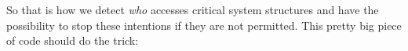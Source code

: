 \documentclass[12pt]{article}
\begin{document}
So that is how we detect \emph{who} accesses critical system
structures and have the possibility to stop these intentions if they
are not permitted.  This pretty big piece of code should do the trick:



%
\end{document}
